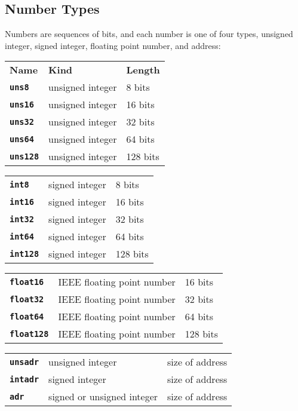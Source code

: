 \documentclass[12pt]{article}
\makeatletter
\newcommand{\TT}[1]{{\tt \bfseries #1}}
\newcommand{\ttkey}[1]{\TT{#1}\index{#1@{\tt #1}}}
\newenvironment{indpar}[1][0.3in]%
	{\begin{list}{}%
		     {\setlength{\itemsep}{0in}%
		      \setlength{\topsep}{0in}%
		      \setlength{\parsep}{1ex}%
		      \setlength{\labelwidth}{#1}%
		      \setlength{\leftmargin}{#1}%
		      \addtolength{\leftmargin}{\labelsep}}%
	 \item}%
	{\end{list}}
\makeatother
\begin{document}
\subsection{Number Types}
\label{NUMBER-TYPES}

Numbers are sequences of bits, and each number is one of
four types, unsigned integer, signed integer, floating point number,
and address:

\begin{indpar}
\begin{tabular}{p{1in}@{~~~~~~}p{2in}@{~~~~~~}l}
\bf Name & \bf Kind & \bf Length \\[2ex]
\ttkey{uns8}		& unsigned integer & 8 bits \\
\ttkey{uns16}		& unsigned integer & 16 bits \\
\ttkey{uns32}		& unsigned integer & 32 bits \\
\ttkey{uns64}		& unsigned integer & 64 bits \\
\ttkey{uns128}		& unsigned integer & 128 bits
\end{tabular}

\begin{tabular}{p{1in}@{~~~~~~}p{2in}@{~~~~~~}l}
\ttkey{int8}		& signed integer & 8 bits \\
\ttkey{int16}		& signed integer & 16 bits \\
\ttkey{int32}		& signed integer & 32 bits \\
\ttkey{int64}		& signed integer & 64 bits \\
\ttkey{int128}		& signed integer & 128 bits
\end{tabular}

\begin{tabular}{p{1in}@{~~~~~~}p{2in}@{~~~~~~}l}
\ttkey{float16}		& IEEE floating point number & 16 bits \\
\ttkey{float32}		& IEEE floating point number & 32 bits \\
\ttkey{float64}		& IEEE floating point number & 64 bits \\
\ttkey{float128}	& IEEE floating point number & 128 bits
\end{tabular}

\begin{tabular}{p{1in}@{~~~~~~}p{2in}@{~~~~~~}l}
\ttkey{unsadr}		& unsigned integer & size of address \\
\ttkey{intadr}		& signed integer & size of address \\
\ttkey{adr}		& signed or unsigned integer & size of address \\
\end{tabular}
\end{indpar}
\end{document}
